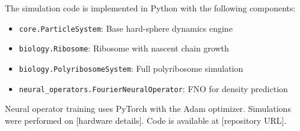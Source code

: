 \documentclass[11pt]{article}
\begin{document}
The simulation code is implemented in Python with the following components:
\begin{itemize}[nosep]
    \item \texttt{core.ParticleSystem}: Base hard-sphere dynamics engine
    \item \texttt{biology.Ribosome}: Ribosome with nascent chain growth
    \item \texttt{biology.PolyribosomeSystem}: Full polyribosome simulation
    \item \texttt{neural\_operators.FourierNeuralOperator}: FNO for density prediction
\end{itemize}

Neural operator training uses PyTorch with the Adam optimizer. Simulations were performed on [hardware details]. Code is available at [repository URL].

\end{document}
